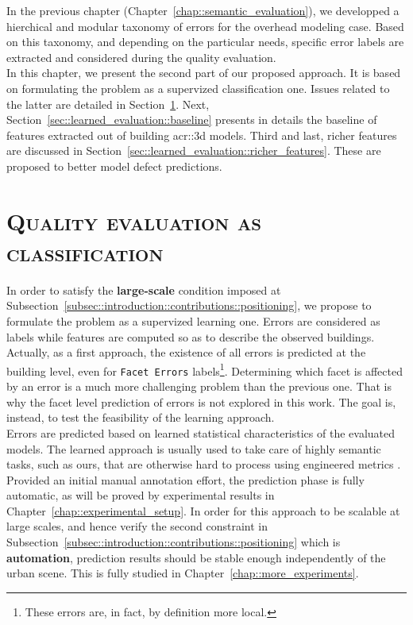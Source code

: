 \minitoc

\vfill

In the previous chapter (Chapter~\ref{chap::semantic_evaluation}), we developped a hierchical and modular taxonomy of errors for the overhead modeling case.
Based on this taxonomy, and depending on the particular needs, specific error labels are extracted and considered during the quality evaluation.\\
In this chapter, we present the second part of our proposed approach.
It is based on formulating the problem as a supervized classification one.
Issues related to the latter are detailed in Section~\ref{sec::learned_evaluation::classification}.
Next, Section~\ref{sec::learned_evaluation::baseline} presents in details the baseline of features extracted out of building \gls{acr::3d} models.
Third and last, richer features are discussed in Section~\ref{sec::learned_evaluation::richer_features}.
These are proposed to better model defect predictions.

\clearpage

\section{\textsc{Quality evaluation as classification}}
    \label{sec::learned_evaluation::classification}
    In order to satisfy the \textbf{large-scale} condition imposed at Subsection~\ref{subsec::introduction::contributions::positioning}, we propose to formulate the problem as a supervized learning one.
    Errors are considered as labels while features are computed so as to describe the observed buildings.
    Actually, as a first approach, the existence of all errors is predicted at the building level, even for \texttt{Facet Errors} labels\footnote{These errors are, in fact, by definition more local.}.
    Determining which facet is affected by an error is a much more challenging problem than the previous one.
    That is why the facet level prediction of errors is not explored in this work.
    The goal is, instead, to test the feasibility of the learning approach.\\

    Errors are predicted based on learned statistical characteristics of the evaluated models.
    The learned approach is usually used to take care of highly semantic tasks, such as ours, that are otherwise hard to process using engineered metrics \addref.\\
    Provided an initial manual annotation effort, the prediction phase is fully automatic, as will be proved by experimental results in Chapter~\ref{chap::experimental_setup}.
    In order for this approach to be scalable at large scales, and hence verify the second constraint in Subsection~\ref{subsec::introduction::contributions::positioning} which is \textbf{automation}, prediction results should be stable enough independently of the urban scene.
    This is fully studied in Chapter~\ref{chap::more_experiments}.\\

